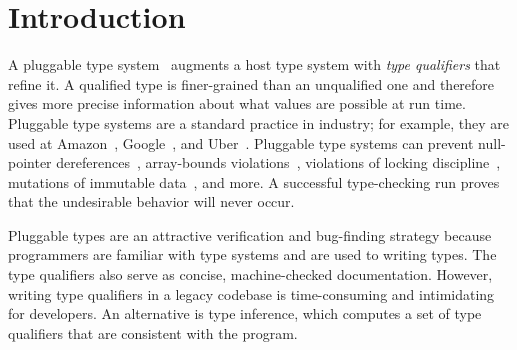 \section{Introduction}
\label{sec:intro}



A pluggable type system~\cite{FosterFFA99} augments a host type system
with \emph{type qualifiers} that refine it.  A qualified type is
finer-grained than an unqualified one and therefore gives more precise
information about what values are possible at run time.
Pluggable type systems are a standard practice in industry; for example,
they are used at Amazon~\cite{KelloggSTE2020,KelloggRSSE2020},
Google~\cite{SadowskiAEMCJ2018}, and Uber~\cite{BanerjeeCS2019}.
Pluggable type systems
can prevent  null-pointer
dereferences~\cite{BanerjeeCS2019,PapiACPE2008,DietlDEMS2011},
array-bounds violations~\cite{KelloggDME2018},
violations of locking discipline~\cite{ErnstLMST2016},
mutations of immutable data~\cite{DietlDEMS2011,PapiACPE2008,coblenz2017glacier},
and more.
A successful type-checking run proves that the undesirable behavior will
never occur.

Pluggable types are an attractive verification and bug-finding strategy
because programmers
are familiar with type systems and are used to writing types.
The type qualifiers also serve as concise, machine-checked documentation.
However, writing type qualifiers in a legacy codebase
is time-consuming and intimidating for developers.
An alternative is type inference, which computes a set of type
qualifiers that are consistent with the program.

